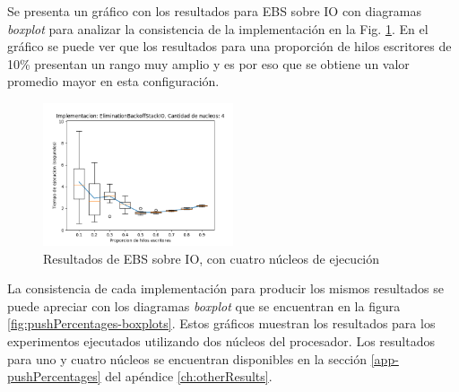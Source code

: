 Se presenta un gráfico con los resultados para EBS sobre IO con diagramas \emph{boxplot} para analizar la consistencia de la implementación en la Fig. \ref{fig:pushPercentages-ebsio-4}.
En el gráfico se puede ver que los resultados para una proporción de hilos escritores de 10\% presentan un rango muy amplio y es por eso que se obtiene un valor promedio mayor en esta configuración.

\begin{figure}[t]
    \centering
    \includegraphics[width=0.5\textwidth]{images/pushPercentages/plots/expEBSIO-4.png}
    \caption{Resultados de EBS sobre IO, con cuatro núcleos de ejecución}
    \label{fig:pushPercentages-ebsio-4}
\end{figure}

La consistencia de cada implementación para producir los mismos resultados se puede apreciar con los diagramas \emph{boxplot} que se encuentran en la figura \ref{fig:pushPercentages-boxplots}. Estos gráficos muestran los resultados para los experimentos ejecutados utilizando dos núcleos del procesador. Los resultados para uno y cuatro núcleos se encuentran disponibles en la sección \ref{app-pushPercentages} del apéndice \ref{ch:otherResults}.


